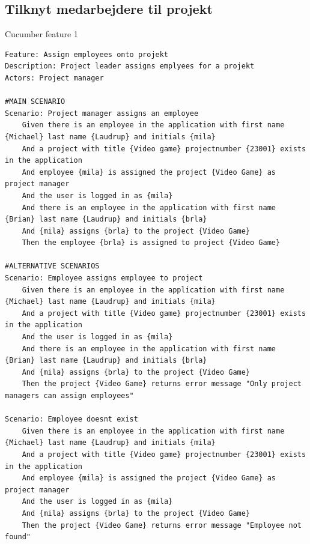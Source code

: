 \subsection{Tilknyt medarbejdere til projekt}
\begin{listing}[H]
    \centering
    \caption{Cucumber feature 1}\label{lst:feature1}
    \begin{verbatim}
Feature: Assign employees onto projekt
Description: Project leader assigns emplyees for a projekt
Actors: Project manager

#MAIN SCENARIO
Scenario: Project manager assigns an employee
    Given there is an employee in the application with first name {Michael} last name {Laudrup} and initials {mila}
    And a project with title {Video game} projectnumber {23001} exists in the application
    And employee {mila} is assigned the project {Video Game} as project manager
    And the user is logged in as {mila}
    And there is an employee in the application with first name {Brian} last name {Laudrup} and initials {brla}
    And {mila} assigns {brla} to the project {Video Game}
    Then the employee {brla} is assigned to project {Video Game}

#ALTERNATIVE SCENARIOS
Scenario: Employee assigns employee to project
    Given there is an employee in the application with first name {Michael} last name {Laudrup} and initials {mila}
    And a project with title {Video game} projectnumber {23001} exists in the application
    And the user is logged in as {mila}
    And there is an employee in the application with first name {Brian} last name {Laudrup} and initials {brla}
    And {mila} assigns {brla} to the project {Video Game}
    Then the project {Video Game} returns error message "Only project managers can assign employees"

Scenario: Employee doesnt exist
    Given there is an employee in the application with first name {Michael} last name {Laudrup} and initials {mila}
    And a project with title {Video game} projectnumber {23001} exists in the application
    And employee {mila} is assigned the project {Video Game} as project manager
    And the user is logged in as {mila}
    And {mila} assigns {brla} to the project {Video Game}
    Then the project {Video Game} returns error message "Employee not found"
    \end{verbatim}
\end{listing}
